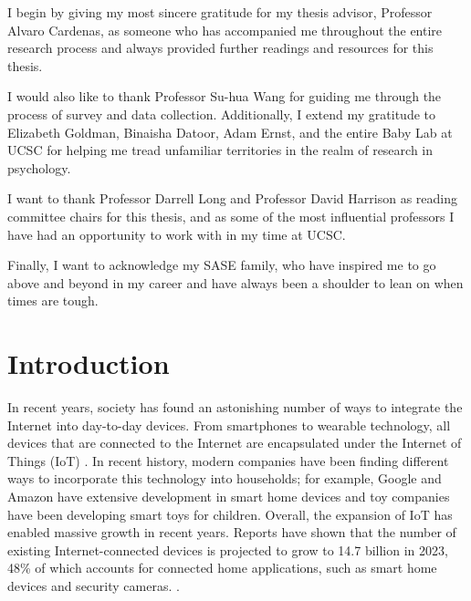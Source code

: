 \documentclass[12pt]{ucthesis}
\begin{document}
\begin{frontmatter}
\begin{acknowledgements}
I begin by giving my most sincere gratitude for my thesis advisor, Professor Alvaro Cardenas, as someone who has accompanied me throughout the entire research process and always provided further readings and resources for this thesis.

I would also like to thank Professor Su-hua Wang for guiding me through the process of survey and data collection. Additionally, I extend my gratitude to Elizabeth Goldman, Binaisha Datoor, Adam Ernst, and the entire Baby Lab at UCSC for helping me tread unfamiliar territories in the realm of research in psychology.

I want to thank Professor Darrell Long and Professor David Harrison as reading committee chairs for this thesis, and as some of the most influential professors I have had an opportunity to work with in my time at UCSC.

Finally, I want to acknowledge my SASE family, who have inspired me to go above and beyond in my career and have always been a shoulder to lean on when times are tough.

\end{acknowledgements}

\end{frontmatter}

\chapter{Introduction}
In recent years, society has found an astonishing number of ways to integrate the Internet into day-to-day devices. From smartphones to wearable technology, all devices that are connected to the Internet are encapsulated under the Internet of Things (IoT) \cite{gubbi:iot}. In recent history, modern companies have been finding different ways to incorporate this technology into households; for example, Google and Amazon have extensive development in smart home devices and toy companies have been developing smart toys for children. Overall, the expansion of IoT has enabled massive growth in recent years. Reports have shown that the number of existing Internet-connected devices is projected to grow to 14.7 billion in 2023, 48\% of which accounts for connected home applications, such as smart home devices and security cameras. \cite{cisco}.
\end{document}
